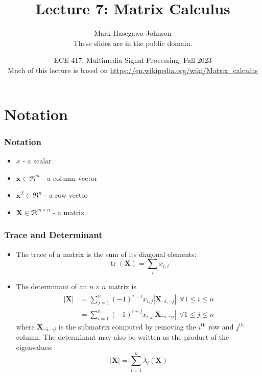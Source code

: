 \documentclass{beamer}
\title{Lecture 7: Matrix Calculus}
\author{Mark Hasegawa-Johnson\\These slides are in the public domain.}
\date{ECE 417: Multimedia Signal Processing, Fall 2023\\Much of this lecture is based on \url{https://en.wikipedia.org/wiki/Matrix_calculus}}
\DeclareMathOperator{\tr}{tr}
\begin{document}
\begin{frame}
  \maketitle
\end{frame}

\begin{frame}
  \tableofcontents
\end{frame}

\section{Notation}
\setcounter{subsection}{1}

\begin{frame}
  \frametitle{Notation}
  \begin{itemize}
  \item $x$ - a scalar
  \item $\mathbf{x}\in\Re^m$ - a column vector
  \item $\mathbf{x}^T\in\Re^n$ - a row vector
  \item $\mathbf{X}\in\Re^{m\times n}$ - a matrix
  \end{itemize}
\end{frame}

\begin{frame}
  \frametitle{Trace and Determinant}
  \begin{itemize}
  \item The trace of a matrix is the sum of its diagonal elements:
    \begin{displaymath}
      \tr(\mathbf{X})=\sum_i x_{i,i}
    \end{displaymath}
  \item The determinant of an $n\times n$ matrix is
    \begin{align*}
      \left|\mathbf{X}\right|
      &=\sum_{j=1}^n (-1)^{i+j} x_{i,j}\left|\mathbf{X}_{\neg i,\neg j}\right|~~\forall 1\le i\le n\\
      &=\sum_{i=1}^n (-1)^{i+j} x_{i,j}\left|\mathbf{X}_{\neg i,\neg j}\right|~~\forall 1\le j\le n
    \end{align*}
    where $\mathbf{X}_{\neg i,\neg j}$ is the submatrix computed by
    removing the $i^{\text{th}}$ row and $j^{\text{th}}$ column.  The
    determinant may also be written as the product of the eigenvalues:
    \begin{displaymath}
      \left|\mathbf{X}\right| = \sum_{i=1}^n \lambda_i(\mathbf{X})
    \end{displaymath}
  \end{itemize}
\end{frame}
\end{document}
